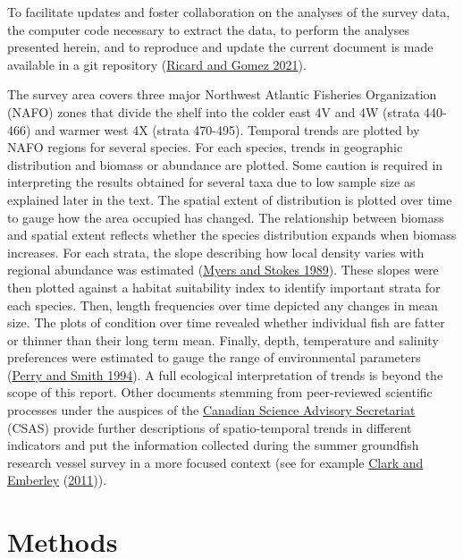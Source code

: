 \documentclass[12pt]{article}\usepackage[]{graphicx}\usepackage[]{color}
\begin{document}
To facilitate updates and foster collaboration on the analyses of the survey data, the computer code necessary to extract the data, to perform the analyses presented herein, and to reproduce and update the current document is made available in a git repository (\protect\hyperlink{ref-Ricard-Gomez-2021}{Ricard and Gomez 2021}).

The survey area covers three major Northwest Atlantic Fisheries Organization (NAFO) zones that divide the shelf into the colder east 4V and 4W (strata 440-466) and warmer west 4X (strata 470-495). Temporal trends are plotted by NAFO regions for several species. For each species, trends in geographic distribution and biomass or abundance are plotted. Some caution is required in interpreting the results obtained for several taxa due to low sample size as explained later in the text. The spatial extent of distribution is plotted over time to gauge how the area occupied has changed. The relationship between biomass and spatial extent reflects whether the species distribution expands when biomass increases. For each strata, the slope describing how local density varies with regional abundance was estimated (\protect\hyperlink{ref-Myers:Stokes:1989}{Myers and Stokes 1989}). These slopes were then plotted against a habitat suitability index to identify important strata for each species. Then, length frequencies over time depicted any changes in mean size. The plots of condition over time revealed whether individual fish are fatter or thinner than their long term mean. Finally, depth, temperature and salinity preferences were estimated to gauge the range of environmental parameters (\protect\hyperlink{ref-Perry:Smith:1994:cjfas}{Perry and Smith 1994}). A full ecological interpretation of trends is beyond the scope of this report. Other documents stemming from peer-reviewed scientific processes under the auspices of the \href{https://www.dfo-mpo.gc.ca/csas-sccs/}{Canadian Science Advisory Secretariat} (CSAS) provide further descriptions of spatio-temporal trends in different indicators and put the information collected during the summer groundfish research vessel survey in a more focused context (see for example \protect\hyperlink{ref-ClarkEmberley2011}{Clark and Emberley} (\protect\hyperlink{ref-ClarkEmberley2011}{2011})).

\hypertarget{methods}{%
\section{Methods}\label{methods}}
\end{document}
